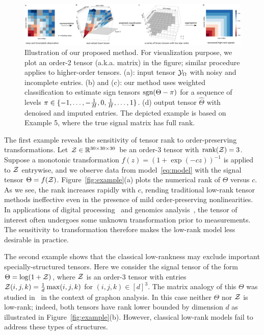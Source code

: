 \documentclass{article}
\theoremstyle{plain}
\theoremstyle{definition}
\def\sign{\textup{sgn}}
\begin{document}
\begin{figure}[h!]
\vspace{-.2cm}
\centerline{\includegraphics[width=1\textwidth]{figure/image_new2.pdf}}
\caption{Illustration of our proposed method. For visualization purpose, we plot an order-2 tensor (a.k.a. matrix) in the figure; similar procedure applies to higher-order tensors. (a): input tensor $\mathcal{Y}_\Omega$ with noisy and incomplete entries. (b) and (c): our method uses weighted classification to estimate sign tensors $\sign(\Theta-\pi)$ for a sequence of levels $\pi\in \{-1,\ldots,-{1\over H},0,{1\over H},\ldots,1\}$. (d) output tensor $\hat \Theta$ with denoised and imputed entries. The depicted example is based on Example 5, where the true signal matrix has full rank. }\label{fig:demo}
\end{figure}

The first example reveals the sensitivity of tensor rank to order-preserving transformations. Let $\mathcal{Z} \in \mathbb{R}^{30\times 30\times 30}$ be an order-3 tensor with $\text{rank}(\mathcal{Z})=3$. Suppose a monotonic transformation $f(z)=(1+\exp(-cz))^{-1}$ is applied to $\mathcal{Z}$ entrywise, and we observe data from model~\eqref{eq:model} with the signal tensor $\Theta=f(\mathcal{Z})$. Figure~\ref{fig:example}(a) plots the numerical rank of $\Theta$ versus $c$. %
As we see, the rank increases rapidly with $c$, rending traditional low-rank tensor methods ineffective even in the presence of mild order-preserving nonlinearities. In applications of digital processing~\cite{karbasi2012robust} and genomics analysis~\cite{wang2019three}, the tensor of interest often undergoes some unknown transformation prior to measurements. The sensitivity to transformation therefore makes the low-rank model less desirable in practice. 


The second example shows that the classical low-rankness may exclude important specially-structured tensors. Here we consider the signal tensor of the form $\Theta=\log(1+\mathcal{Z})$, where $\mathcal{Z}$ is an order-3 tensor with entries $\mathcal{Z}(i,j,k)={1\over d}\max(i,j,k)$ for $(i,j,k)\in[d]^3$. The matrix analogy of this $\Theta$ was studied in~\citet{chan2014consistent} in the context of graphon analysis. In this case neither $\Theta$ nor $\mathcal{Z}$ is low-rank; indeed, both tensors have rank lower bounded by dimension $d$ as illustrated in Figure~\ref{fig:example}(b). However, classical low-rank models fail to address these types of structures. 
\end{document}
